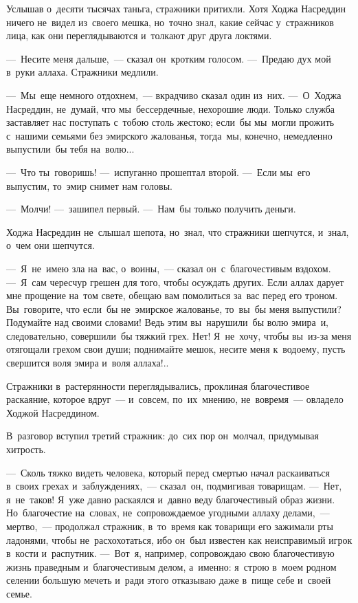 \documentclass[12pt,a4paper]{book}
\begin{document}
Услышав о~десяти тысячах таньга, стражники притихли. Хотя Ходжа Насреддин ничего не~видел из~своего мешка, но~точно знал, какие сейчас у~стражников лица, как они переглядываются и~толкают друг друга локтями.

—~Несите меня дальше,~— сказал он~кротким голосом. —~Предаю дух мой в~руки аллаха. Стражники медлили.

—~Мы~еще немного отдохнем,~— вкрадчиво сказал один из~них. —~О~Ходжа Насреддин, не~думай, что мы~бессердечные, нехорошие люди. Только служба заставляет нас поступать с~тобою столь жестоко; если~бы мы~могли прожить с~нашими семьями без эмирского жалованья, тогда~мы, конечно, немедленно выпустили~бы тебя на~волю...

—~Что ты~говоришь! —~испуганно прошептал второй. —~Если мы~его выпустим, то~эмир снимет нам головы.

—~Молчи! —~зашипел первый. —~Нам~бы только получить деньги.

Ходжа Насреддин не~слышал шепота, но~знал, что стражники шепчутся, и~знал, о~чем они шепчутся.

—~Я~не~имею зла на~вас, о~воины,~— сказал он~с~благочестивым вздохом. —~Я~сам чересчур грешен для того, чтобы осуждать других. Если аллах дарует мне прощение на~том свете, обещаю вам помолиться за~вас перед его троном. Вы~говорите, что если~бы не~эмирское жалованье, то~вы~бы меня выпустили? Подумайте над своими словами! Ведь этим вы~нарушили~бы волю эмира~и, следовательно, совершили~бы тяжкий грех. Нет! Я~не~хочу, чтобы вы~из-за меня отягощали грехом свои души; поднимайте мешок, несите меня к~водоему, пусть свершится воля эмира и~воля аллаха!..

Стражники в~растерянности переглядывались, проклиная благочестивое раскаяние, которое вдруг~— и~совсем, по~их~мнению, не~вовремя~— овладело Ходжой Насреддином.

В~разговор вступил третий стражник: до~сих пор он~молчал, придумывая хитрость.

—~Сколь тяжко видеть человека, который перед смертью начал раскаиваться в~своих грехах и~заблуждениях,~— сказал~он, подмигивая товарищам. —~Нет, я~не~таков! Я~уже давно раскаялся и~давно веду благочестивый образ жизни. Но~благочестие на~словах, не~сопровождаемое угодными аллаху делами,~— мертво,~— продолжал стражник, в~то~время как товарищи его зажимали рты ладонями, чтобы не~расхохотаться, ибо он~был известен как неисправимый игрок в~кости и~распутник. —~Вот~я, например, сопровождаю свою благочестивую жизнь праведным и~благочестивым делом, а~именно: я~строю в~моем родном селении большую мечеть и~ради этого отказываю даже в~пище себе и~своей семье.
\end{document}
